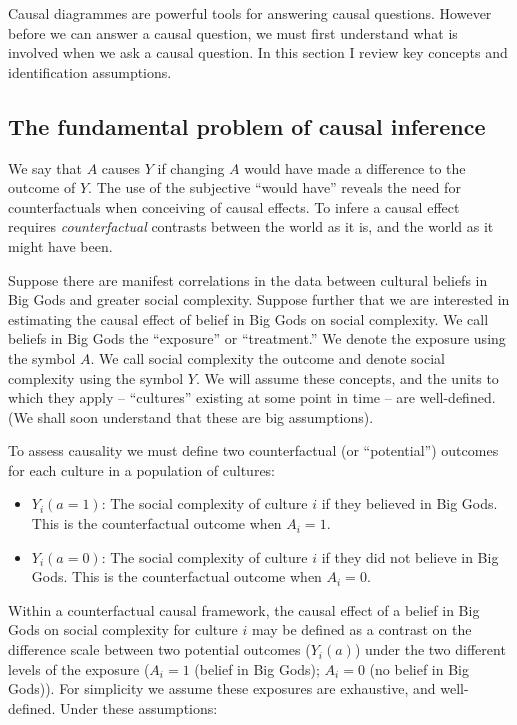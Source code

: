 \documentclass[
  singlecolumn]{report}
\providecommand{\tightlist}{%
  \setlength{\itemsep}{0pt}\setlength{\parskip}{0pt}}\usepackage{longtable,booktabs,array}
\begin{document}
Causal diagrammes are powerful tools for answering causal questions.
However before we can answer a causal question, we must first understand
what is involved when we ask a causal question. In this section I review
key concepts and identification assumptions.

\hypertarget{the-fundamental-problem-of-causal-inference}{%
\subsection{The fundamental problem of causal
inference}\label{the-fundamental-problem-of-causal-inference}}

We say that \(A\) causes \(Y\) if changing \(A\) would have made a
difference to the outcome of \(Y\). The use of the subjective ``would
have'' reveals the need for counterfactuals when conceiving of causal
effects. To infere a causal effect requires \emph{counterfactual}
contrasts between the world as it is, and the world as it might have
been.

Suppose there are manifest correlations in the data between cultural
beliefs in Big Gods and greater social complexity. Suppose further that
we are interested in estimating the causal effect of belief in Big Gods
on social complexity. We call beliefs in Big Gods the ``exposure'' or
``treatment.'' We denote the exposure using the symbol \(A\). We call
social complexity the outcome and denote social complexity using the
symbol \(Y\). We will assume these concepts, and the units to which they
apply -- ``cultures'' existing at some point in time -- are
well-defined. (We shall soon understand that these are big assumptions).

To assess causality we must define two counterfactual (or ``potential'')
outcomes for each culture in a population of cultures:

\begin{itemize}
\tightlist
\item
  \(Y_i(a = 1)\): The social complexity of culture \(i\) if they
  believed in Big Gods. This is the counterfactual outcome when
  \(A_i = 1\).
\item
  \(Y_i(a = 0)\): The social complexity of culture \(i\) if they did not
  believe in Big Gods. This is the counterfactual outcome when
  \(A_i = 0\).
\end{itemize}

Within a counterfactual causal framework, the causal effect of a belief
in Big Gods on social complexity for culture \(i\) may be defined as a
contrast on the difference scale between two potential outcomes
(\(Y_i(a)\)) under the two different levels of the exposure (\(A_i = 1\)
(belief in Big Gods); \(A_i = 0\) (no belief in Big Gods)). For
simplicity we assume these exposures are exhaustive, and well-defined.
Under these assumptions:
\end{document}
